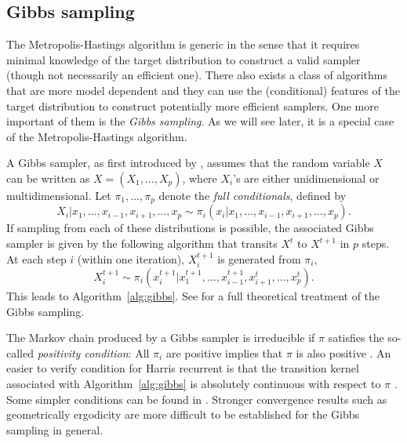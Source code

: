 \subsection{Gibbs sampling}
\label{sub:Gibbs sampling}

The Metropolis-Hastings algorithm is generic in the sense that it requires minimal knowledge of the target distribution to construct a valid sampler (though not necessarily an efficient one). There also exists a class of \mcmc algorithms that are more model dependent and they can use the (conditional) features of the target distribution to construct potentially more efficient samplers. One more important of them is the \emph{Gibbs sampling}. As we will see later, it is a special case of the Metropolis-Hastings algorithm.

A Gibbs sampler, as first introduced by \cite{Geman:1993bp}, assumes that the random variable $X$ can be written as $X = (X_1,\dots,X_p)$, where $X_i$'s are either unidimensional or multidimensional. Let $\pi_1,\dots,\pi_p$ denote the \emph{full conditionals}, defined by
\begin{equation}
  X_i|x_1,\dots,x_{i-1},x_{i+1},\dots,x_p
  \sim \pi_i(x_i|x_1,\dots,x_{i-1},x_{i+1},\dots,x_p).
\end{equation}
If sampling from each of these distributions is possible, the associated Gibbs sampler is given by the following algorithm that transits $X^t$ to $X^{t+1}$ in $p$ steps. At each step $i$ (within one iteration), $X_i^{t+1}$ is generated from $\pi_i$,
\begin{equation}
  X_i^{t+1} \sim
  \pi_i(x_i^{t+1}|x_1^{t+1},\dots,x_{i-1}^{t+1},x_{i+1}^t,\dots,x_p^t).
\end{equation}
This leads to Algorithm~\ref{alg:gibbs}. See \cite[][chap.~9 and~10]{Robert:2004tn} for a full theoretical treatment of the Gibbs sampling.



The Markov chain produced by a Gibbs sampler is irreducible if $\pi$ satisfies the so-called \emph{positivity condition}: All $\pi_i$ are positive implies that $\pi$ is also positive \cite[][Theorem~10.8]{Robert:2004tn}. An easier to verify condition for Harris recurrent is that the transition kernel associated with Algorithm~\ref{alg:gibbs} is absolutely continuous with respect to $\pi$ \cite{Tierney:1994uk}. Some simpler conditions can be found in \cite{Hobert:1997vx}. Stronger convergence results such as geometrically ergodicity are more difficult to be established for the Gibbs sampling in general.

